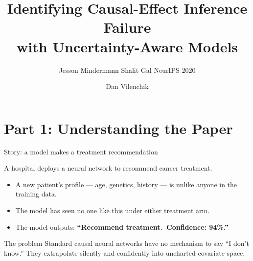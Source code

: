 \documentclass[aspectratio=169]{beamer}
\title[Causal Inference]{Identifying Causal-Effect Inference Failure\\
       with Uncertainty-Aware Models}
\subtitle{Jesson \quad Mindermann \quad Shalit \quad Gal \hfill NeurIPS 2020}
\author{Dan Vilenchik}
\institute{Ben-Gurion University of the Negev}
\date{}
\begin{document}
\begin{frame}
  \titlepage
\end{frame}

\section{Part 1: Understanding the Paper}

\begin{frame}{Story: a model makes a treatment recommendation}

A hospital deploys a neural network to recommend cancer treatment.
\bigskip

\begin{itemize}
  \item A new patient's profile --- age, genetics, history --- is unlike
        anyone in the training data.
  \item The model has seen no one like this under either treatment arm.
  \item The model outputs: \textbf{``Recommend treatment.\ Confidence: 94\%.''}
\end{itemize}

\bigskip
\begin{alertblock}{The problem}
Standard causal neural networks have no mechanism to say ``I don't know.''
They extrapolate silently and confidently into uncharted covariate space.
\end{alertblock}
\end{frame}
\end{document}
